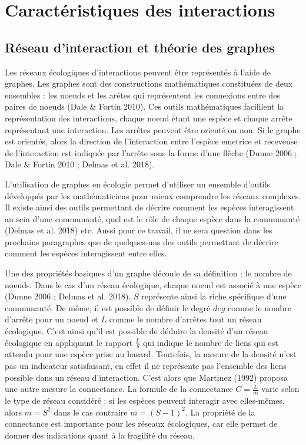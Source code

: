 \documentclass[
  12pt,
  a4paper,
  oneside]{report}
\begin{document}
\hypertarget{caractuxe9ristiques-des-interactions}{%
\chapter{Caractéristiques des
interactions}\label{caractuxe9ristiques-des-interactions}}

\hypertarget{ruxe9seau-dinteraction-et-thuxe9orie-des-graphes}{%
\section{Réseau d'interaction et théorie des
graphes}\label{ruxe9seau-dinteraction-et-thuxe9orie-des-graphes}}

Les réseaux écologiques d'interactions peuvent être représentés à l'aide
de graphes. Les graphes sont des constructions mathématiques constituées
de deux ensembles : les noeuds et les arêtes qui représentent les
connexions entre des paires de noeuds (Dale \& Fortin 2010). Ces outils
mathématiques facililent la représentation des interactions, chaque
noeud étant une espèce et chaque arrête représentant une interaction.
Les arrêtes peuvent être orienté ou non. Si le graphe est orientés,
alors la direction de l'interaction entre l'espèce emetrice et receveuse
de l'interaction est indiquée par l'arrête sous la forme d'une flêche
(Dunne 2006 ; Dale \& Fortin 2010 ; Delmas et al. 2018).

L'utilisation de graphes en écologie permet d'utiliser un ensemble
d'outils développés par les mathématiciens pour mieux comprendre les
réseaux complexes. Il existe ainsi des outils permettant de décrire
comment les espèces interagissent au sein d'une communauté, quel est le
rôle de chaque espèce dans la communauté (Delmas et al. 2018) etc. Aussi
pour ce travail, il ne sera question dans les prochains paragraphes que
de quelques-uns des outils permettant de décrire comment les espèces
interagissent entre elles.

Une des propriétés basiques d'un graphe découle de sa définition : le
nombre de noeuds. Dans le cas d'un réseau écologique, chaque noeud est
associé à une espèce (Dunne 2006 ; Delmas et al. 2018). \(S\) représente
ainsi la riche spécifique d'une communauté. De même, il est possible de
définir le degré \(deg\) comme le nombre d'arrête pour un noeud et \(L\)
comme le nombre d'arrêtes tout un réseau écologique. C'est ainsi qu'il
est possible de déduire la densité d'un réseau écologique en appliquant
le rapport \(\frac{L}{S}\) qui indique le nombre de liens qui est
attendu pour une espèce prise au hasard. Toutefois, la mesure de la
densité n'est pas un indicateur satisfaisant, en effet il ne représente
pas l'ensemble des liens possible dans un réseau d'interaction. C'est
alors que Martinez (1992) proposa une autre mesure la connectance. La
formule de la connectance \(C = \frac{L}{m}\) varie selon le type de
réseau considéré : si les espèces peuvent interagir avec elles-mêmes,
alors \(m = S^2\) dans le cas contraire \(m = (S - 1)^2\). La propriété
de la connectance est importante pour les réseaux écologiques, car elle
permet de donner des indications quant à la fragilité du réseau.
\end{document}
